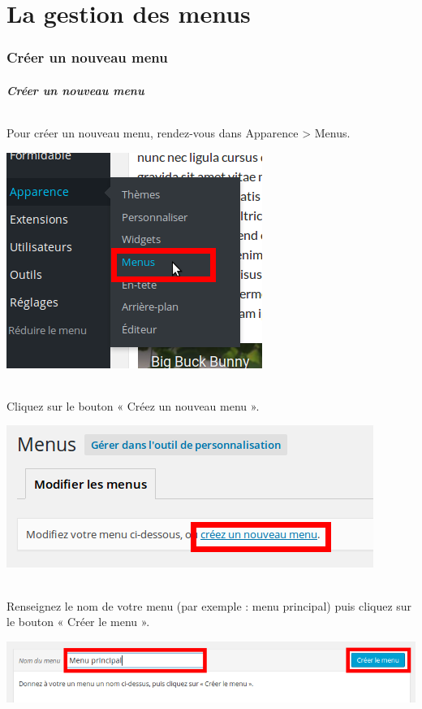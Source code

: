 \documentclass[10pt,a4paper]{article}
\begin{document}
\part{La gestion des menus}
\newpage
\section{Créer un nouveau menu}
\subsubsection{Créer un nouveau menu}
\paragraph{}Pour créer un nouveau menu, rendez-vous dans Apparence > Menus.
\begin{center}
\includegraphics[scale=0.3]{img/0143.png}
\end{center}
\paragraph{}Cliquez sur le bouton « Créez un nouveau menu ».
\begin{center}
\includegraphics[scale=0.3]{img/0144.png}
\end{center}
\paragraph{}Renseignez le nom de votre menu (par exemple : menu principal) puis cliquez sur le bouton « Créer le menu ».
\begin{center}
\includegraphics[scale=0.3]{img/0145.png}
\end{center}
\end{document}
